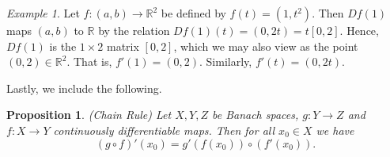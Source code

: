 \documentclass[12pt,reqno]{amsart}
\numberwithin{equation}{section}  %
\numberwithin{figure}{section}
\newcommand{\rr}{\mathbb{R}}
\theoremstyle{plain}
\newtheorem{proposition}{Proposition}
\theoremstyle{definition}
\theoremstyle{remark}
\newtheorem{example}{Example}
\begin{document}
\begin{framed}
\begin{example}
Let $f: (a,b) \to \rr^2$ be defined by $f(t) = (1, t^2)$. Then $Df(1)$ maps
$(a,b)$ to $\rr$ by the relation $Df(1)(t) = (0, 2t) = t[0, 2]$. Hence, $Df(1)$ is the $1
\times 2$ matrix $[0,2]$, which we may also view as the point $(0,2) \in \rr^2$.
That is, $f'(1) = (0,2)$. Similarly, $f'(t) = (0,2t)$.
\end{example}
\end{framed}

Lastly, we include the following.
%
%
\begin{proposition}
		(Chain Rule) Let $X,Y,Z$ be Banach spaces, $g: Y \to Z$ and $f:
		X \to Y$ continuously differentiable maps. Then for all $x_0
		\in X$ we have \begin{equation*} (g \circ f)' (x_0) =
			g'(f(x_0)) \circ (f'(x_0)).
		\end{equation*} 
	\end{proposition}
\end{document}
